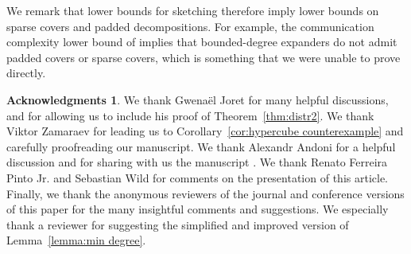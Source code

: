 \documentclass[11pt]{article}
\theoremstyle{definition}
\newtheorem*{acknowledgement}{Acknowledgments}
\begin{document}


 


We remark that lower bounds for sketching therefore imply lower bounds
on sparse covers and padded
decompositions. For example, the communication complexity lower bound of
\cite{AK08} implies that bounded-degree expanders do not admit padded covers or sparse covers, which
is something that we were unable to prove directly.


\begin{acknowledgement}
We thank Gwena\"el Joret for many helpful discussions, and for allowing us to include his proof of
Theorem~\ref{thm:distr2}. We thank Viktor Zamaraev for leading us to Corollary~\ref{cor:hypercube
counterexample} and carefully proofreading our manuscript. We thank Alexandr Andoni for a helpful discussion and for sharing with us the
manuscript \cite{AK08}. We thank Renato Ferreira Pinto Jr. and Sebastian Wild for comments on the
presentation of this article. Finally, we thank the anonymous reviewers of the
journal and 
conference \cite{EHK22} versions of this paper for the many insightful
comments and suggestions. We especially thank a reviewer for suggesting the simplified and improved
version of Lemma~\ref{lemma:min degree}.
\end{acknowledgement}



%




\end{document}
